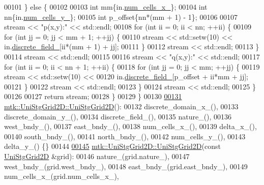 \begin{DoxyCode}
00101   \} \textcolor{keywordflow}{else} \{
00102 
00103     \textcolor{keywordtype}{int} mm\{in.\hyperlink{classmtk_1_1UniStgGrid2D_ac03a0f4840ee6ae1bc853e5d9c0df8d1}{num\_cells\_x\_}\};
00104     \textcolor{keywordtype}{int} nn\{in.\hyperlink{classmtk_1_1UniStgGrid2D_a3e4f61d781212ad57c34e9446c4074b6}{num\_cells\_y\_}\};
00105     \textcolor{keywordtype}{int} p\_offset\{nn*(mm + 1) - 1\};
00106 
00107     stream << \textcolor{stringliteral}{"p(x,y):"} << std::endl;
00108     \textcolor{keywordflow}{for} (\textcolor{keywordtype}{int} ii = 0; ii < nn; ++ii) \{
00109       \textcolor{keywordflow}{for} (\textcolor{keywordtype}{int} jj = 0; jj < mm + 1; ++jj) \{
00110         stream << std::setw(10) << in.\hyperlink{classmtk_1_1UniStgGrid2D_ad7474b2669ee988b84aed20b7f5dc7be}{discrete\_field\_}[ii*(mm + 1) + jj];
00111       \}
00112       stream << std::endl;
00113     \}
00114     stream << std::endl;
00115 
00116     stream << \textcolor{stringliteral}{"q(x,y):"} << std::endl;
00117     \textcolor{keywordflow}{for} (\textcolor{keywordtype}{int} ii = 0; ii < nn + 1; ++ii) \{
00118       \textcolor{keywordflow}{for} (\textcolor{keywordtype}{int} jj = 0; jj < mm; ++jj) \{
00119         stream << std::setw(10) <<
00120           in.\hyperlink{classmtk_1_1UniStgGrid2D_ad7474b2669ee988b84aed20b7f5dc7be}{discrete\_field\_}[p\_offset + ii*mm + jj];
00121       \}
00122       stream << std::endl;
00123     \}
00124     stream << std::endl;
00125   \}
00126 
00127   \textcolor{keywordflow}{return} stream;
00128 \}
00129 \}
00130 
\hypertarget{mtk__uni__stg__grid__2d_8cc_source_l00131}{}\hyperlink{classmtk_1_1UniStgGrid2D_a40db9a6d21e0f4cf70c478fcc3b94531}{00131} \hyperlink{classmtk_1_1UniStgGrid2D_a40db9a6d21e0f4cf70c478fcc3b94531}{mtk::UniStgGrid2D::UniStgGrid2D}():
00132     discrete\_domain\_x\_(),
00133     discrete\_domain\_y\_(),
00134     discrete\_field\_(),
00135     nature\_(),
00136     west\_bndy\_(),
00137     east\_bndy\_(),
00138     num\_cells\_x\_(),
00139     delta\_x\_(),
00140     south\_bndy\_(),
00141     north\_bndy\_(),
00142     num\_cells\_y\_(),
00143     delta\_y\_() \{\}
00144 
\hypertarget{mtk__uni__stg__grid__2d_8cc_source_l00145}{}\hyperlink{classmtk_1_1UniStgGrid2D_aab6e54b48c3f32de808460ef46f598d4}{00145} \hyperlink{classmtk_1_1UniStgGrid2D_a40db9a6d21e0f4cf70c478fcc3b94531}{mtk::UniStgGrid2D::UniStgGrid2D}(\textcolor{keyword}{const} 
      \hyperlink{classmtk_1_1UniStgGrid2D}{UniStgGrid2D} &grid):
00146     nature\_(grid.nature\_),
00147     west\_bndy\_(grid.west\_bndy\_),
00148     east\_bndy\_(grid.east\_bndy\_),
00149     num\_cells\_x\_(grid.num\_cells\_x\_),

\end{DoxyCode}
